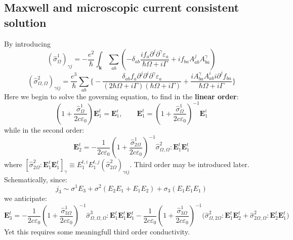 \documentclass[aps, prb, superscriptaddress, longbibliography]{revtex4-2}
\renewcommand{\epsilon}{\varepsilon}
\numberwithin{equation}{section}
\begin{document}
\subsection{Maxwell and microscopic current consistent solution}
By introducing 
\begin{equation}
    (\hat{\sigma}^1_\Omega)_{\gamma j} = -\frac{e^2}{\hbar}\int_\mathbf{k} \sum_{ab}\left(-\delta_{ab}\frac{if_a \partial^j\partial^\gamma \epsilon_a}{\hbar\Omega+i\Gamma}+if_{ba}A^{j}_{ab}A^\gamma_{ba}\right)
\end{equation}
\begin{equation}
    (\hat{\sigma}^2_{\Omega,\Omega})_{\gamma ij} =\frac{e^3}{\hbar}\sum_{ab}\Bigg\{
    -\frac{\delta_{ab}f_a \partial^j\partial^i\partial^\gamma \epsilon_a}{(2\hbar\Omega+i\Gamma)(\hbar\Omega+i\Gamma)}+\frac{iA^\gamma_{ba} A^{i}_{ab}i\partial^jf_{ba}}{\hbar\Omega+i\Gamma}\Bigg\}
\end{equation}
Here we begin to solve the governing equation, to find in the \textbf{linear order}:
\begin{equation}
\boxed{\left(1+\frac{\hat\sigma^1_\Omega}{2c\epsilon_0}\right)\mathbf E_1^t=\mathbf E_1^i,\qquad \mathbf {E}_1^t = \left(1+\frac{\hat\sigma^1_\Omega}{2c\epsilon_0}\right)^{-1}\mathbf {E}_1^i}
\end{equation}
while in the second order:
\begin{equation}
 \boxed{\mathbf{E}_2^{t}=-\frac{1}{2c\varepsilon_0}\left(1+\frac{\hat\sigma^1_{2\Omega}}{2c\epsilon_0}\right)^{-1}\hat{\sigma}^{2}_{\Omega,\Omega}:\mathbf{E}_1^{t}\mathbf{E}_1^{t}}
\end{equation}
where $[\hat{\sigma}^{2}_{2\Omega}:\mathbf{E}_1^{t}\mathbf{E}_1^{t}]_\gamma\equiv E_1^{t,i}E_1^{t,j}(\hat{\sigma}^2_{2\Omega})_{\gamma ij}$. Third order may be introduced later. Schematically, since:
\begin{equation}
    j_3 \sim \sigma^1 E_{3} + \sigma^2 (E_{2}E_1 + E_1 E_2) + \sigma_3 (E_1 E_1E_1) 
\end{equation}
we anticipate:
\begin{equation}
    \boxed{\mathbf{E}_3^{t}=-\frac{1}{2c\varepsilon_0}\left(1+\frac{\hat\sigma^1_{3\Omega}}{2c\epsilon_0}\right)^{-1}\hat{\sigma}^{3}_{\Omega,\Omega,\Omega}:\mathbf{E}_1^{t}\mathbf{E}_1^{t}\mathbf{E}_1^{t}-\frac{1}{2c\varepsilon_0}\left(1+\frac{\hat\sigma^1_{3\Omega}}{2c\epsilon_0}\right)^{-1}\bigg(\hat{\sigma}^{2}_{\Omega,2\Omega}:\mathbf{E}_1^{t}\mathbf{E}_2^{t}+\hat{\sigma}^{2}_{2\Omega,\Omega}:\mathbf{E}_2^{t}\mathbf{E}_1^{t}\bigg)}
\end{equation}
Yet this requires some meaningfull third order conductivity.
\end{document}
